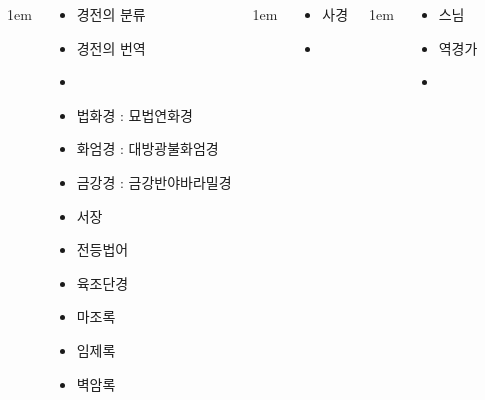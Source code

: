 \documentclass[20pt, a0paper, landscape]{tikzposter}
\begin{document}
\begin{columns}
			{
					\setlength{\leftmargini}{4em}
					\setlength{\labelsep} {1em}
				\begin{LARGE}
					\begin{itemize}
					\item 경전의 분류
					\item 경전의 번역
					\item 
					\item 법화경 : 묘법연화경
					\item 화엄경 : 대방광불화엄경 
					\item 금강경 : 금강반야바라밀경
					\item 서장
					\item 전등법어
					\item  육조단경
					\item  마조록
					\item  임제록
					\item  벽암록
					\end{itemize}
				\end{LARGE}
			} %

			{
					\setlength{\leftmargini}{4em}
					\setlength{\labelsep} {1em}
				\begin{LARGE}
					\begin{itemize}
					\item 사경
					\item  
					\end{itemize}
				\end{LARGE}
			} %

			{
					\setlength{\leftmargini}{4em}
					\setlength{\labelsep} {1em}
				\begin{LARGE}
					\begin{itemize}
					\item 스님
					\item 역경가
					\item 
					\end{itemize}
				\end{LARGE}
			} %



\end{columns}
\end{document}
